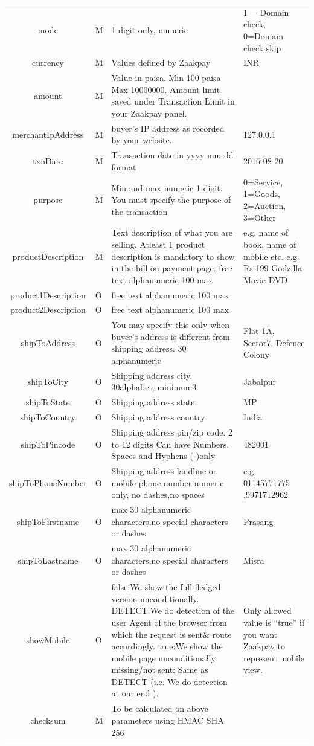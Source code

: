 \documentclass{article}
\begin{document}
\begin{longtable}{||c| p{2.09cm}| p{5.5cm}| p{4.7cm}||}
mode & M & 1 digit only, numeric & 1 = Domain check, 0=Domain check skip\\
currency & M & Values defined by Zaakpay & INR\\
amount & M & Value in paisa. Min 100 paisa Max 10000000. Amount limit saved under Transaction Limit in your Zaakpay panel. & \\
merchantIpAddress & M & buyer's IP address as recorded by your website. & 127.0.0.1 \\
txnDate & M & Transaction date in yyyy-mm-dd format & 2016-08-20 \\
purpose & M & Min and max numeric 1 digit. You must specify the purpose of the transaction & 0=Service, 1=Goods, 2=Auction, 3=Other\\
productDescription & M & Text description of what you are selling. Atleast 1 product description is mandatory to show in the bill on payment page. free text alphanumeric 100 max & e.g. name of book, name of mobile etc. e.g. Rs 199 Godzilla Movie DVD \\
product1Description & O & free text alphanumeric 100 max & \\
product2Description & O & free text alphanumeric 100 max & \\
shipToAddress & O & You may specify this only when buyer's address is different from shipping address. 30 alphanumeric & Flat 1A, Sector7, Defence Colony \\
shipToCity & O & Shipping address city. 30alphabet, minimum3 & Jabalpur \\
shipToState & O & Shipping address state & MP \\
shipToCountry & O & Shipping address country & India \\

shipToPincode & O & Shipping address pin/zip code. 2 to 12 digits Can have Numbers, Spaces and Hyphens (-)only & 482001\\
shipToPhoneNumber & O & Shipping address landline or mobile phone number numeric only, no dashes,no spaces & e.g. 01145771775 ,9971712962\\
shipToFirstname & O & max 30 alphanumeric characters,no  special characters or dashes & Prasang\\
shipToLastname & O & max 30 alphanumeric characters,no  special characters or dashes & Misra\\
showMobile & O & false:We show the full-fledged version unconditionally. DETECT:We do detection of the user Agent of the browser from which the request is sent\& route accordingly. true:We show the mobile page unconditionally. missing/not sent: Same as DETECT (i.e. We do detection at our end ). & Only allowed value is “true” if you want Zaakpay to represent mobile view.\\
checksum & M & To be calculated on above parameters using HMAC SHA 256 & \\
\end{longtable}
\end{document}
